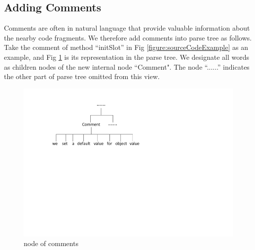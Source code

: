 \subsection{Adding Comments}


Comments are often in natural language that provide valuable information
about the nearby code fragments. We therefore add comments into parse tree
as follows. Take the comment of method ``initSlot'' in
Fig \ref{figure:sourceCodeExample} as an example, and
Fig \ref{figure:nodeOfComment} is its representation in the parse tree.
We designate all words as children nodes of the new internal node ``Comment".
The node ``......'' indicates the other part of parse tree omitted from this
view.

%
%
%
%
%
%

\begin{figure}[!htp]
 \centering
 \includegraphics[width=0.7\linewidth]{img/comment.pdf}
 \caption{\label{figure:nodeOfComment} node of comments}
\end{figure}

